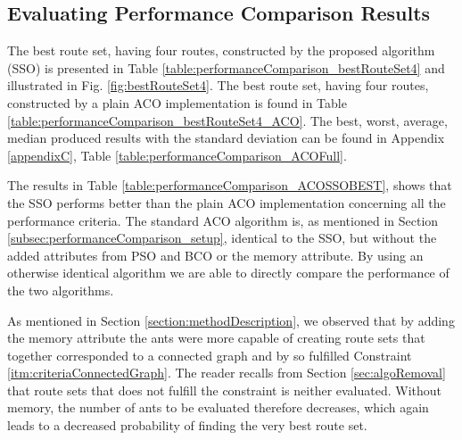 
\subsection{Evaluating Performance Comparison Results}


The best route set, having four routes, constructed by the proposed algorithm (SSO) is presented in Table \vref{table:performanceComparison_bestRouteSet4} and illustrated in Fig. \vref{fig:bestRouteSet4}. The best route set, having four routes, constructed by a plain ACO implementation is found in Table \vref{table:performanceComparison_bestRouteSet4_ACO}. The best, worst, average, median produced results with the standard deviation can be found in Appendix \ref{appendixC}, Table \vref{table:performanceComparison_ACOFull}. 

The results in Table \vref{table:performanceComparison_ACOSSOBEST}, shows that the SSO performs better than the plain ACO implementation concerning all the performance criteria. The standard ACO algorithm is, as mentioned in Section \vref{subsec:performanceComparison_setup}, identical to the SSO, but without the added attributes from PSO and BCO or the memory attribute. By using an otherwise identical algorithm we are able to directly compare the performance of the two algorithms. 

As mentioned in Section \vref{section:methodDescription}, we observed that by adding the memory attribute the ants were more capable of creating route sets that together corresponded to a connected graph and by so fulfilled Constraint \vref{itm:criteriaConnectedGraph}. The reader recalls from Section \vref{sec:algoRemoval} that route sets that does not fulfill the constraint is neither evaluated. Without memory, the number of ants to be evaluated therefore decreases, which again leads to a decreased probability of finding the very best route set. 



